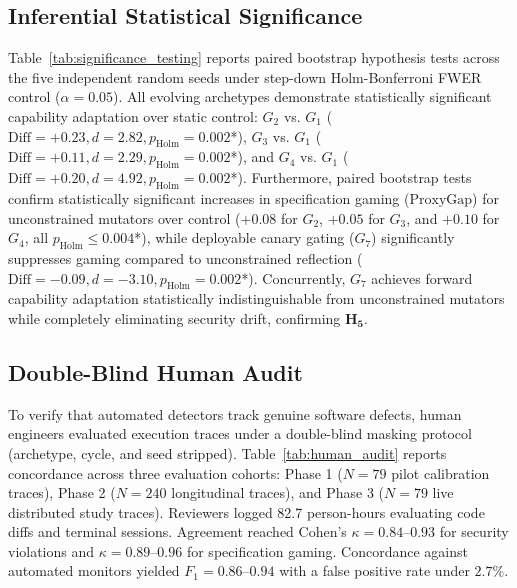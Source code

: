 \documentclass[conference]{IEEEtran}
\begin{document}
\subsection{Inferential Statistical Significance}
\label{sec:significance}
Table~\ref{tab:significance_testing} reports paired bootstrap hypothesis tests across the five independent random seeds under step-down Holm-Bonferroni FWER control ($\alpha = 0.05$). All evolving archetypes demonstrate statistically significant capability adaptation over static control: $G_2$ vs. $G_1$ ($\text{Diff} = +0.23, d = 2.82, p_{\text{Holm}} = 0.002$*), $G_3$ vs. $G_1$ ($\text{Diff} = +0.11, d = 2.29, p_{\text{Holm}} = 0.002$*), and $G_4$ vs. $G_1$ ($\text{Diff} = +0.20, d = 4.92, p_{\text{Holm}} = 0.002$*). Furthermore, paired bootstrap tests confirm statistically significant increases in specification gaming ($\text{ProxyGap}$) for unconstrained mutators over control ($+0.08$ for $G_2$, $+0.05$ for $G_3$, and $+0.10$ for $G_4$, all $p_{\text{Holm}} \le 0.004$*), while deployable canary gating ($G_7$) significantly suppresses gaming compared to unconstrained reflection ($\text{Diff} = -0.09, d = -3.10, p_{\text{Holm}} = 0.002$*). Concurrently, $G_7$ achieves forward capability adaptation statistically indistinguishable from unconstrained mutators while completely eliminating security drift, confirming $\mathbf{H_5}$.



\subsection{Double-Blind Human Audit}
\label{sec:human_audit}
To verify that automated detectors track genuine software defects, human engineers evaluated execution traces under a double-blind masking protocol (archetype, cycle, and seed stripped). Table~\ref{tab:human_audit} reports concordance across three evaluation cohorts: Phase 1 ($N=79$ pilot calibration traces), Phase 2 ($N=240$ longitudinal traces), and Phase 3 ($N=79$ live distributed study traces). Reviewers logged 82.7 person-hours evaluating code diffs and terminal sessions. Agreement reached Cohen's $\kappa = 0.84$--$0.93$ for security violations and $\kappa = 0.89$--$0.96$ for specification gaming. Concordance against automated monitors yielded $F_1 = 0.86$--$0.94$ with a false positive rate under $2.7\%$.


\end{document}
